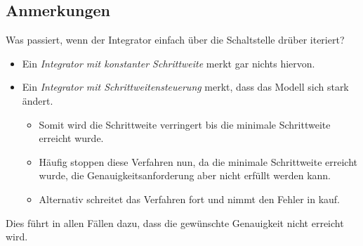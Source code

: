         \subsection{Anmerkungen} %
            Was passiert, wenn der Integrator einfach über die Schaltstelle drüber iteriert?
            \begin{itemize}
            	\item Ein \textit{Integrator mit konstanter Schrittweite} merkt gar nichts hiervon.
            	\item Ein \textit{Integrator mit Schrittweitensteuerung} merkt, dass das Modell sich stark ändert.
                	\begin{itemize}
                		\item Somit wird die Schrittweite verringert bis die minimale Schrittweite erreicht wurde.
                		\item Häufig stoppen diese Verfahren nun, da die minimale Schrittweite erreicht wurde, die Genauigkeitsanforderung aber nicht erfüllt werden kann.
                		\item Alternativ schreitet das Verfahren fort und nimmt den Fehler in kauf.
                	\end{itemize}
            \end{itemize}
            Dies führt in allen Fällen dazu, dass die gewünschte Genauigkeit nicht erreicht wird.

